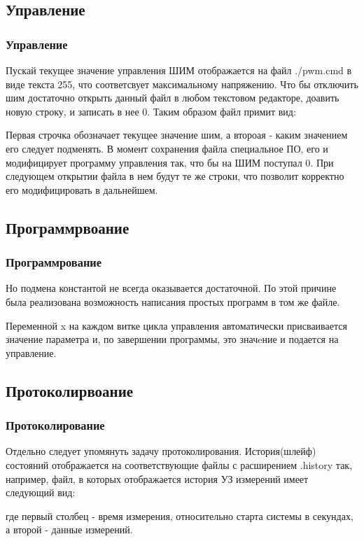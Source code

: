 \documentclass{beamer}
\begin{document}
\subsection{Управление}
\begin{frame}
\frametitle{Управление}
Пускай текущее значение управления ШИМ отображается на файл ./pwm.cmd в виде текста 255, 
что соответсвует максимальному напряжению. Что бы отключить шим достаточно открыть 
данный файл в любом текстовом редакторе, доавить новую строку, и записать в нее 0. 
Таким образом файл примит вид:



Первая строчка обозначает текущее значение шим, а второая - каким значением его
следует подменять. В момент сохранения файла специальное ПО, его и модифицирует программу управления так, 
что бы на ШИМ поступал 0. 
При следующем открытии файла в нем будут те же строки, что позволит корректно его 
модифицировать в дальнейшем.
\end{frame}

\subsection{Программрвоание}
\begin{frame}
\frametitle{Программрование}
Но подмена константой не всегда оказывается достаточной. По этой причине была реализована возможность написания простых программ в том же файле.



Переменной x на каждом витке цикла управления  автоматически присваивается
значение параметра  и, по завершении программы, это значeние и подается на
управление.
\end{frame}


\subsection{Протоколирвоание}
\begin{frame}
\frametitle{Протоколирование}
Отдельно следует упомянуть задачу протоколирования. История(шлейф) состояний отображается на 
соответствующие файлы с расширением .history так, например, файл, в которых
отображается история УЗ измерений имеет следующий вид:




где первый столбец - время измерения, относительно старта системы в секундах, а второй - данные измерений.

\end{frame}

\begin{frame}
\end{frame}
\end{document}
